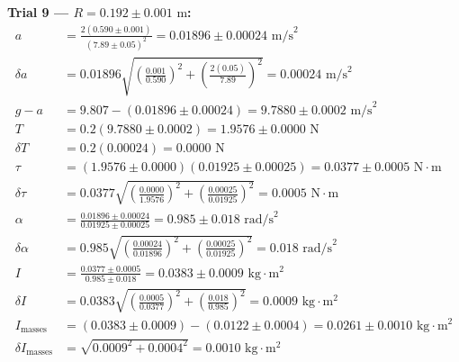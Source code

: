 \documentclass[11pt]{article}
\begin{document}
\textbf{Trial 9 — $R = 0.192 \pm 0.001\text{ m}$:}
\begin{align*}
a &= \frac{2(0.590 \pm 0.001)}{(7.89 \pm 0.05)^2} = 0.01896 \pm 0.00024\text{ m/s}^2 \\
\delta a &= 0.01896\sqrt{\left(\frac{0.001}{0.590}\right)^2 + \left(\frac{2(0.05)}{7.89}\right)^2} = 0.00024\text{ m/s}^2 \\
g - a &= 9.807 - (0.01896 \pm 0.00024) = 9.7880 \pm 0.0002\text{ m/s}^2 \\
T &= 0.2(9.7880 \pm 0.0002) = 1.9576 \pm 0.0000\text{ N} \\
\delta T &= 0.2(0.00024) = 0.0000\text{ N} \\
\tau &= (1.9576 \pm 0.0000)(0.01925 \pm 0.00025) = 0.0377 \pm 0.0005\text{ N}\cdot\text{m} \\
\delta\tau &= 0.0377\sqrt{\left(\frac{0.0000}{1.9576}\right)^2 + \left(\frac{0.00025}{0.01925}\right)^2} = 0.0005\text{ N}\cdot\text{m} \\
\alpha &= \frac{0.01896 \pm 0.00024}{0.01925 \pm 0.00025} = 0.985 \pm 0.018\text{ rad/s}^2 \\
\delta\alpha &= 0.985\sqrt{\left(\frac{0.00024}{0.01896}\right)^2 + \left(\frac{0.00025}{0.01925}\right)^2} = 0.018\text{ rad/s}^2 \\
I &= \frac{0.0377 \pm 0.0005}{0.985 \pm 0.018} = 0.0383 \pm 0.0009\text{ kg}\cdot\text{m}^2 \\
\delta I &= 0.0383\sqrt{\left(\frac{0.0005}{0.0377}\right)^2 + \left(\frac{0.018}{0.985}\right)^2} = 0.0009\text{ kg}\cdot\text{m}^2 \\
I_{\text{masses}} &= (0.0383 \pm 0.0009) - (0.0122 \pm 0.0004) = 0.0261 \pm 0.0010\text{ kg}\cdot\text{m}^2 \\
\delta I_{\text{masses}} &= \sqrt{0.0009^2 + 0.0004^2} = 0.0010\text{ kg}\cdot\text{m}^2
\end{align*}
\end{document}
